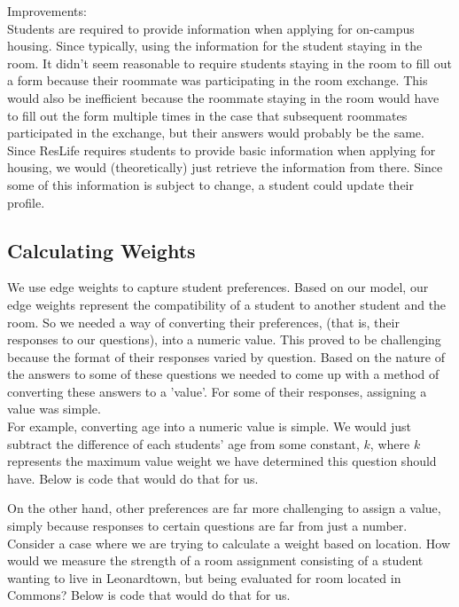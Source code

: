 \documentclass[12pt]{article}
\begin{document}
Improvements:\\
Students are required to provide information when applying for on-campus housing. Since typically, using the information for the student staying in the room. It didn't seem reasonable to require students staying in the room to fill out a form because their roommate was participating in the room exchange. This would also be inefficient because the roommate staying in the room would have to fill out the form multiple times in the case that subsequent roommates participated in the exchange, but their answers would probably be the same. Since ResLife requires students to provide basic information when applying for housing, we would (theoretically) just retrieve the information from there. Since some of this information is subject to change, a student could update their profile. 


\subsection{Calculating Weights}
We use edge weights to capture student preferences.
Based on our model, our edge weights represent the compatibility of a student to another student and the room. So we needed a way of converting their preferences, (that is, their responses to our questions), into a numeric value. 
This proved to be challenging because the format of their responses varied by question. Based on the nature of the answers to some of these questions we needed to come up with a method of converting these answers to a 'value'. For some of their responses, assigning a value was simple.\\

For example, converting age into a numeric value is simple. We would just subtract the difference of each students' age from some constant, $k$, where $k$ represents the maximum value weight we have determined this question should have. Below is code that would do that for us.



On the other hand, other preferences are far more challenging to assign a value, simply because responses to certain questions are far from just a number. Consider a case where we are trying to calculate a weight based on location. How would we measure the strength of a room assignment consisting of a student wanting to live in Leonardtown, but being evaluated for room located in Commons? Below is code that would do that for us. 
\end{document}
